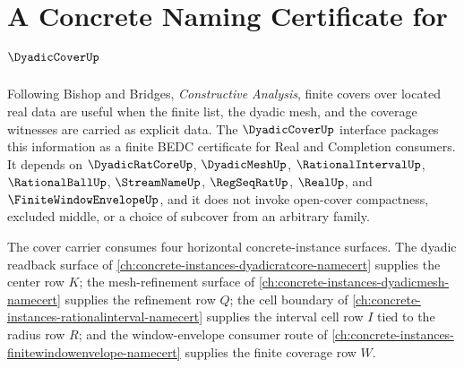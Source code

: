 \chapter{A Concrete Naming Certificate for $\DyadicCoverUp$}
\label{ch:concrete-instances-dyadiccover-namecert}

Following Bishop and Bridges, \emph{Constructive Analysis}, finite covers over
located real data are useful when the finite list, the dyadic mesh, and the
coverage witnesses are carried as explicit data. The $\DyadicCoverUp$
interface packages this information as a finite BEDC certificate for Real and
Completion consumers. It depends on $\DyadicRatCoreUp$, $\DyadicMeshUp$,
$\RationalIntervalUp$, $\RationalBallUp$, $\StreamNameUp$, $\RegSeqRatUp$,
$\RealUp$, and $\FiniteWindowEnvelopeUp$, and it does not invoke open-cover
compactness, excluded middle, or a choice of subcover from an arbitrary family.

The cover carrier consumes four horizontal concrete-instance surfaces. The
dyadic readback surface of \autoref{ch:concrete-instances-dyadicratcore-namecert}
supplies the center row $K$; the mesh-refinement surface of
\autoref{ch:concrete-instances-dyadicmesh-namecert} supplies the refinement row
$Q$; the cell boundary of
\autoref{ch:concrete-instances-rationalinterval-namecert} supplies the interval
cell row $I$ tied to the radius row $R$; and the window-envelope consumer route
of \autoref{ch:concrete-instances-finitewindowenvelope-namecert} supplies the
finite coverage row $W$.

